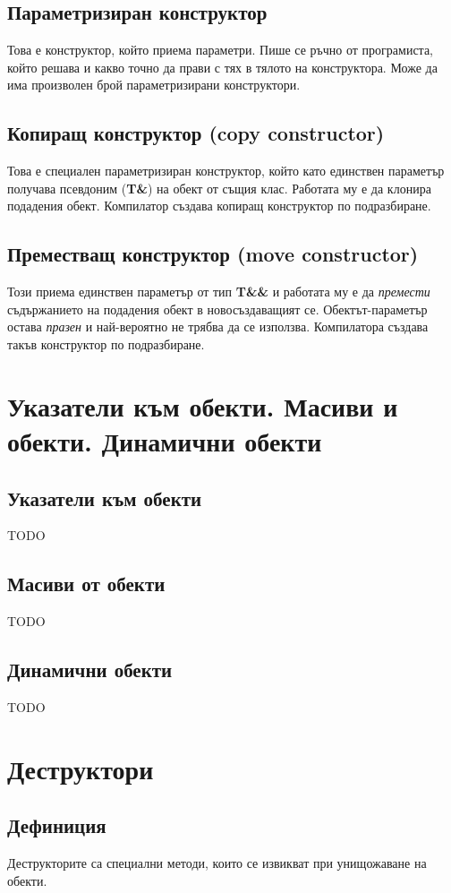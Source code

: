 \documentclass[fleqn,12pt]{article}
\begin{document}
\subsection{Параметризиран конструктор}
Това е конструктор, който приема параметри. Пише се ръчно от програмиста, който решава и какво точно да прави с тях
в тялото на конструктора. Може да има произволен брой параметризирани конструктори.

\subsection{Копиращ конструктор (copy constructor)}
Това е специален параметризиран конструктор, който като единствен параметър получава псевдоним (\textbf{T\&}) на обект от същия клас.
Работата му е да клонира подадения обект. Компилатор създава копиращ конструктор по подразбиране.

\subsection{Преместващ конструктор (move constructor)}
Този приема единствен параметър от тип \textbf{T\&\&} и работата му е да \textit{премести} съдържанието на подадения обект 
в новосъздаващият се. Обектът-параметър остава \textit{празен} и най-вероятно не трябва да се използва.
Компилатора създава такъв конструктор по подразбиране.

\section{Указатели към обекти. Масиви и обекти. Динамични обекти}
\subsection{Указатели към обекти}
TODO

\subsection{Масиви от обекти}
TODO

\subsection{Динамични обекти}
TODO


\section{Деструктори}
\subsection{Дефиниция}
Деструкторите са специални методи, които се извикват при унищожаване на обекти.
\end{document}
